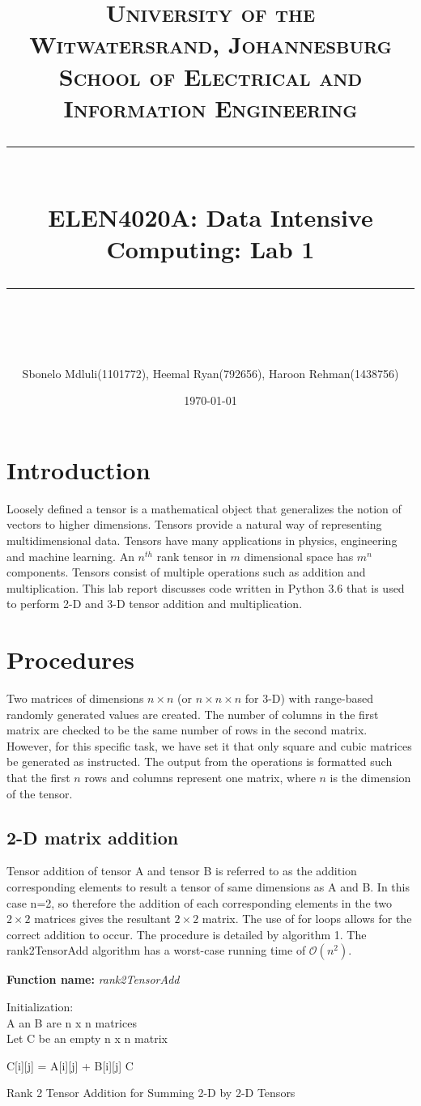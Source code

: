 \documentclass[10pt,journal]{article}
\title{	
	\normalfont\largesize
	\textbf{\textsc{University of the Witwatersrand, Johannesburg}}\\
	\textsc{School of Electrical and Information Engineering}\\ 
	\vspace{5pt} %
	\rule{\linewidth}{0.5pt}\\ %
	\vspace{10pt} %
	{\huge ELEN4020A: Data Intensive Computing: Lab 1}\\ %
	\vspace{1pt} %
	\rule{\linewidth}{2pt}\\ %
	\vspace{1pt} %
}
\author{ Sbonelo Mdluli(1101772), Heemal Ryan(792656), Haroon Rehman(1438756) }
\date{\large\today}
\begin{document}
\maketitle 

\section{Introduction}
Loosely defined a tensor is a mathematical object that generalizes the notion of vectors to higher dimensions. Tensors provide a natural way of representing multidimensional data. Tensors have many applications in physics, engineering and machine learning. An $n^{th}$ rank tensor in $m$ dimensional space has $m^{n}$ components. Tensors consist of multiple operations such as addition and multiplication. This lab report discusses code written in Python 3.6 that is used to perform 2-D and 3-D tensor addition and multiplication.

\section{Procedures}
Two matrices of dimensions $n\times n$ (or $n\times n\times n$  for 3-D) with range-based randomly generated values are created. The number of columns in the first matrix are checked to be the same number of rows in the second matrix. However, for this specific task, we have set it that only square and cubic matrices be generated as instructed. The output from the operations is formatted such that the first $n$ rows and columns represent one matrix, where $n$ is the dimension of the tensor.

\subsection{2-D matrix addition}
Tensor addition of tensor A and tensor B is referred to as the addition corresponding elements to result a tensor of same dimensions as A and B. In this case n=2, so therefore the addition of each corresponding elements in the two  $2\times 2$ matrices gives the resultant  $2\times 2$ matrix. The use of for loops allows for the correct addition to occur. The procedure is detailed by algorithm 1. The rank2TensorAdd algorithm has a worst-case running time of $\mathcal{O}(n^2)$.
\newline 
\begin{algorithm}[H]
\SetAlgoLined
\textbf{Function name:} \emph{rank2TensorAdd}

Initialization\::\\ 
 A an B are n x n matrices\\
 Let C be an empty n x n matrix

    {
        {C[i][j] = A[i][j] + B[i][j]}}
 \Return C
 
\caption{Rank 2 Tensor Addition for Summing 2-D by 2-D Tensors}
\end{algorithm}
\end{document}
